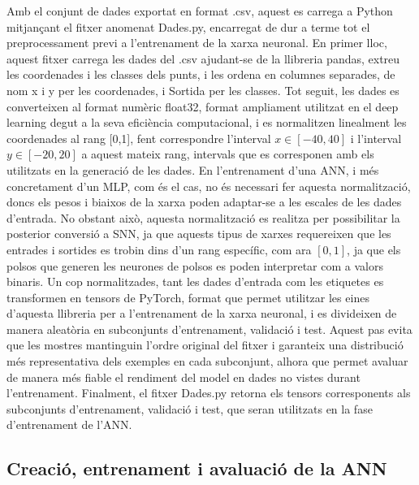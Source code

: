 \documentclass[a4paper,11pt, titlepage, twoside]{article}
\begin{document}
Amb el conjunt de dades exportat en format .csv, aquest es carrega a Python mitjançant el fitxer anomenat Dades.py, encarregat de dur a terme tot el preprocessament previ a l'entrenament de la xarxa neuronal. En primer lloc, aquest fitxer carrega les dades del .csv ajudant-se de la llibreria pandas, extreu les coordenades i les classes dels punts, i les ordena en columnes separades, de nom x i y per les coordenades, i Sortida per les classes. Tot seguit, les dades es converteixen al format numèric float32, format ampliament utilitzat en el deep learning degut a la seva eficiència computacional, i es normalitzen linealment les coordenades al rang [0,1], fent correspondre l'interval $x \in [-40,40]$ i l'interval $y \in [-20,20]$ a aquest mateix rang, intervals que es corresponen amb els utilitzats en la generació de les dades. En l'entrenament d'una ANN, i més concretament d'un MLP, com és el cas, no és necessari fer aquesta normalització, doncs els pesos i biaixos de la xarxa poden adaptar-se a les escales de les dades d'entrada. No obstant això, aquesta normalització es realitza per possibilitar la posterior conversió a SNN, ja que aquests tipus de xarxes requereixen que les entrades i sortides es trobin dins d'un rang específic, com ara $[0,1]$, ja que els polsos que generen les neurones de polsos es poden interpretar com a valors binaris. Un cop normalitzades, tant les dades d'entrada com les etiquetes es transformen en tensors de PyTorch, format que permet utilitzar les eines d'aquesta llibreria per a l'entrenament de la xarxa neuronal, i es divideixen de manera aleatòria en subconjunts d'entrenament, validació i test. Aquest pas evita que les mostres mantinguin l'ordre original del fitxer i garanteix una distribució més representativa dels exemples en cada subconjunt, alhora que permet avaluar de manera més fiable el rendiment del model en dades no vistes durant l'entrenament. Finalment, el fitxer Dades.py retorna els tensors corresponents als subconjunts d'entrenament, validació i test, que seran utilitzats en la fase d'entrenament de l'ANN.

\subsection{Creació, entrenament i avaluació de la ANN}
\end{document}
